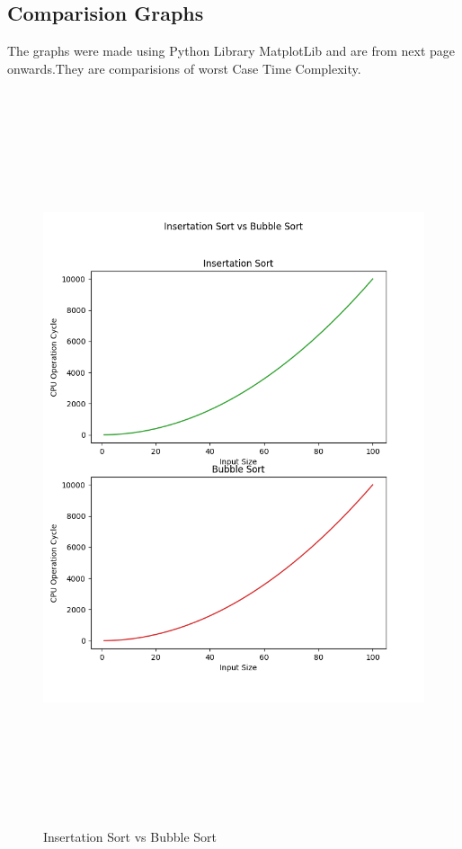 \documentclass{article}
\begin{document}
\subsection{Comparision Graphs}
The graphs were made using Python Library MatplotLib and are from next page onwards.They are comparisions of worst Case Time Complexity.
\clearpage
\begin{figure}[h]
    \centerline{\includegraphics[width=7in,height=8.5in]{Insertation Sort_Bubble Sort.png}}
    \caption{Insertation Sort vs Bubble Sort}
\end{figure}
\end{document}
